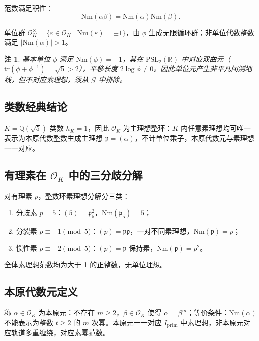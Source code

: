 \documentclass[12pt,a4paper]{article}
\newtheorem{remark}[theorem]{注}
\begin{document}
范数满足积性：
\[
\mathrm{Nm}(\alpha\beta) = \mathrm{Nm}(\alpha)\mathrm{Nm}(\beta).
\]

单位群 $\mathcal{O}_K^\times = \{\varepsilon \in \mathcal{O}_K \mid \mathrm{Nm}(\varepsilon) = \pm 1\}$，由 $\phi$ 生成无限循环群；非单位代数整数满足 $|\mathrm{Nm}(\alpha)| > 1$。

\begin{remark}
基本单位 $\phi$ 满足 $\mathrm{Nm}(\phi) = -1$，其在 $\mathrm{PSL}_2(\mathbb{R})$ 中对应双曲元（$\mathrm{tr}(\phi + \phi^{-1}) = \sqrt{5} > 2$），平移长度 $2\log\phi \neq 0$。因此单位元产生非平凡闭测地线，但不对应素理想，须从 $\mathcal{G}$ 中排除。
\end{remark}

\subsection{类数经典结论}

$K = \mathbb{Q}(\sqrt{5})$ 类数 $h_K = 1$，因此 $\mathcal{O}_K$ 为主理想整环：$K$ 内任意素理想均可唯一表示为本原代数整数生成主理想 $\mathfrak{p} = (\alpha)$，不计单位乘子，本原代数元与素理想一一对应。

\subsection{有理素在 $\mathcal{O}_K$ 中的三分歧分解}

对有理素 $p$，整数环素理想分解分三类：

\begin{enumerate}[label=\arabic*.]
\item 分歧素 $p = 5$：$(5) = \mathfrak{p}_5^2$，$\mathrm{Nm}(\mathfrak{p}_5) = 5$；
\item 分裂素 $p \equiv \pm 1 \pmod{5}$：$(p) = \mathfrak{p}\bar{\mathfrak{p}}$，一对不同素理想，$\mathrm{Nm}(\mathfrak{p}) = p$；
\item 惯性素 $p \equiv \pm 2 \pmod{5}$：$(p) = \mathfrak{p}$ 保持素，$\mathrm{Nm}(\mathfrak{p}) = p^2$。
\end{enumerate}

全体素理想范数均为大于 1 的正整数，无单位理想。

\subsection{本原代数元定义}

称 $\alpha \in \mathcal{O}_K$ 为本原元：不存在 $m \geq 2$，$\beta \in \mathcal{O}_K$ 使得 $\alpha = \beta^m$；等价条件：$\mathrm{Nm}(\alpha)$ 不能表示为整数 $t \geq 2$ 的 $m$ 次幂。本原元一一对应 $I_{\mathrm{prim}}$ 中素理想，非本原元对应轨道多重缠绕，对应素幂范数。
\end{document}
